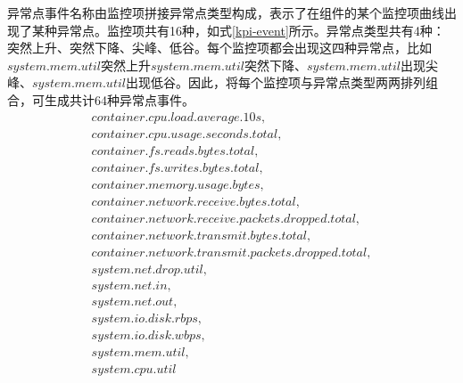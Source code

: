 异常点事件名称由监控项拼接异常点类型构成，表示了在组件的某个监控项曲线出现了某种异常点。监控项共有16种，如式\ref{kpi-event}所示。异常点类型共有4种：突然上升、突然下降、尖峰、低谷。每个监控项都会出现这四种异常点，比如$system.mem.util$突然上升$system.mem.util$突然下降、$system.mem.util$出现尖峰、$system.mem.util$出现低谷。因此，将每个监控项与异常点类型两两排列组合，可生成共计64种异常点事件。
\begin{equation}
    \begin{array}{l}
        container.cpu.load.average.10s,\\
        container.cpu.usage.seconds.total,\\
        container.fs.reads.bytes.total,\\
        container.fs.writes.bytes.total,\\
        container.memory.usage.bytes,\\
        container.network.receive.bytes.total,\\
        container.network.receive.packets.dropped.total,\\
        container.network.transmit.bytes.total,\\
        container.network.transmit.packets.dropped.total,\\
        system.net.drop.util,\\
        system.net.in,\\
        system.net.out,\\
        system.io.disk.rbps,\\
        system.io.disk.wbps,\\
        system.mem.util,\\
        system.cpu.util\\ 
    \end{array}
    \label{kpi-event}
\end{equation}

